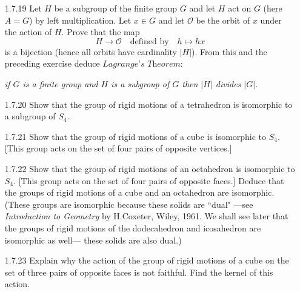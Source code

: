 \begin{enumerate}
      We can thus conclude that $\sim$ is an equivalence relation on $A$. \qed
   \item[1.7.19]  Let $H$ be a subgroup of the finite group $G$ and let $H$ act
                  on $G$ (here $A = G$) by left multiplication. Let $x \in G$
                  and let $\mathcal{O}$ be the orbit of $x$ under the action of
                  $H$. Prove that the map
                  $$H \rightarrow \mathcal{O}\quad \text{defined by} \quad
                    h \mapsto hx$$
                  is a bijection (hence all orbits have cardinality $|H|$). From
                  this and the preceding exercise deduce
                  $\textit{Lagrange's Theorem}:$
                  \begin{center}
                     \textit{if $G$ is a finite group and $H$ is a subgroup of
                     $G$ then $|H|$ divides $|G|$}.
                  \end{center}
   \item[1.7.20]  Show that the group of rigid motions of a tetrahedron is
                  isomorphic to a subgroup of $S_4$.
   \item[1.7.21]  Show that the group of rigid motions of a cube is isomorphic
                  to $S_4$. [This group acts on the set of four pairs of
                  opposite vertices.]
   \item[1.7.22]  Show that the group of rigid motions of an octahedron is
                  isomorphic to $S_4$. [This group acts on the set
                  of four pairs of opposite faces.] Deduce that the groups of
                  rigid motions of a cube and an octahedron are isomorphic.
                  (These groups are isomorphic because these solids are ``dual"
                  ---see \textit{Introduction to Geometry} by H.Coxeter, Wiley,
                  1961. We shall see later that the groups of rigid motions of
                  the dodecahedron and icosahedron are isomorphic as well---
                  these solids are also dual.)
   \item[1.7.23]  Explain why the action of the group of rigid motions of a cube
                  on the set of three pairs of opposite faces is not faithful.
                  Find the kernel of this action.
\end{enumerate}
